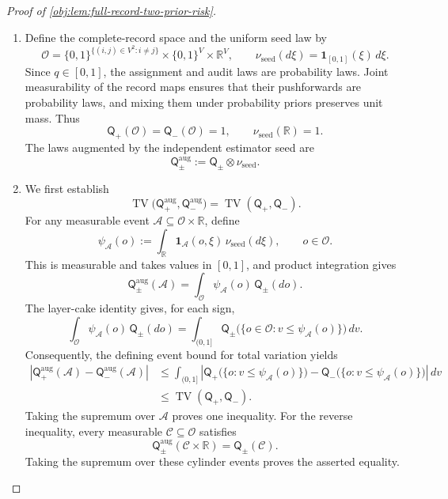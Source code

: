 \documentclass[11pt]{article}
\begin{document}
\begin{proof}[Proof of \cref{obj:lem:full-record-two-prior-risk}]
\begin{enumerate}
\item Define the complete-record space and the uniform seed law by
\[
\mathcal O
=
\{0,1\}^{\{(i,j)\in V^2:i\ne j\}}
\times\{0,1\}^{V}\times\mathbb R^{V},
\qquad
\nu_{\mathrm{seed}}(d\xi)
=
\mathbf1_{[0,1]}(\xi)\,d\xi.
\]
Since \(q\in[0,1]\), the assignment and audit laws are probability laws. Joint measurability of the record maps ensures that their pushforwards are probability laws, and mixing them under probability priors preserves unit mass. Thus
\[
\mathsf Q_+(\mathcal O)=\mathsf Q_-(\mathcal O)=1,
\qquad
\nu_{\mathrm{seed}}(\mathbb R)=1.
\]
The laws augmented by the independent estimator seed are
\[
\mathsf Q_\pm^{\mathrm{aug}}
:=
\mathsf Q_\pm\otimes\nu_{\mathrm{seed}}.
\]

\item We first establish
\begin{equation}\label{eq:full-record-two-prior-tv-seed}
\operatorname{TV}
\bigl(\mathsf Q_+^{\mathrm{aug}},\mathsf Q_-^{\mathrm{aug}}\bigr)
=
\operatorname{TV}(\mathsf Q_+,\mathsf Q_-).
\end{equation}
For any measurable event \(\mathcal A\subseteq\mathcal O\times\mathbb R\), define
\[
\psi_{\mathcal A}(o)
:=
\int_{\mathbb R}\mathbf1_{\mathcal A}(o,\xi)\,
\nu_{\mathrm{seed}}(d\xi),
\qquad o\in\mathcal O.
\]
This is measurable and takes values in \([0,1]\), and product integration gives
\[
\mathsf Q_\pm^{\mathrm{aug}}(\mathcal A)
=
\int_{\mathcal O}\psi_{\mathcal A}(o)\,\mathsf Q_\pm(do).
\]
The layer-cake identity gives, for each sign,
\[
\int_{\mathcal O}\psi_{\mathcal A}(o)\,\mathsf Q_\pm(do)
=
\int_{(0,1]}
\mathsf Q_\pm\bigl(\{o\in\mathcal O:v\le\psi_{\mathcal A}(o)\}\bigr)\,dv.
\]
Consequently, the defining event bound for total variation yields
\[
\begin{aligned}
\left|
\mathsf Q_+^{\mathrm{aug}}(\mathcal A)
-\mathsf Q_-^{\mathrm{aug}}(\mathcal A)
\right|
&\le
\int_{(0,1]}
\left|
\mathsf Q_+\bigl(\{o:v\le\psi_{\mathcal A}(o)\}\bigr)
-\mathsf Q_-\bigl(\{o:v\le\psi_{\mathcal A}(o)\}\bigr)
\right|\,dv\\
&\le \operatorname{TV}(\mathsf Q_+,\mathsf Q_-).
\end{aligned}
\]
Taking the supremum over \(\mathcal A\) proves one inequality. For the reverse inequality, every measurable \(\mathcal C\subseteq\mathcal O\) satisfies
\[
\mathsf Q_\pm^{\mathrm{aug}}(\mathcal C\times\mathbb R)
=
\mathsf Q_\pm(\mathcal C).
\]
Taking the supremum over these cylinder events proves the asserted equality.


\end{enumerate}
\end{proof}
\end{document}
